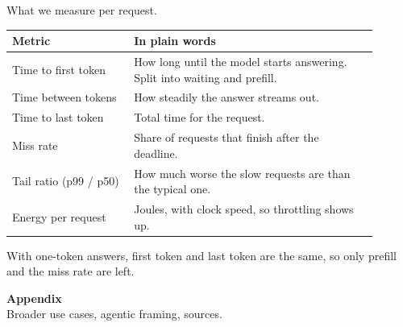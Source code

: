 \documentclass[11pt,aspectratio=43]{beamer}
\begin{document}
\begin{frame}{What we measure per request.}

\vspace{0.2cm}
\begin{center}
\small
\raggedright
\renewcommand{\arraystretch}{1.6}
\setlength{\aboverulesep}{0pt}
\setlength{\belowrulesep}{0pt}
\begin{tabular}{>{\raggedright\arraybackslash}p{0.30\linewidth}|>{\raggedright\arraybackslash}p{0.60\linewidth}}
\toprule
\textbf{Metric} & \textbf{In plain words} \\
\midrule
Time to first token & How long until the model starts answering. Split into waiting and prefill. \\
Time between tokens & How steadily the answer streams out. \\
Time to last token & Total time for the request. \\
Miss rate & Share of requests that finish after the deadline. \\
Tail ratio (p99 / p50) & How much worse the slow requests are than the typical one. \\
Energy per request & Joules, with clock speed, so throttling shows up. \\
\bottomrule
\end{tabular}
\end{center}

\vspace{0.3cm}
\small
With one-token answers, first token and last token are the same, so only prefill and the miss rate are left.

\end{frame}

\appendix

\begin{frame}[plain]
  \vfill
  \begin{center}
    {\Large\bfseries Appendix}\\[0.8em]
    \small Broader use cases, agentic framing, sources.
  \end{center}
  \vfill
\end{frame}
\end{document}
